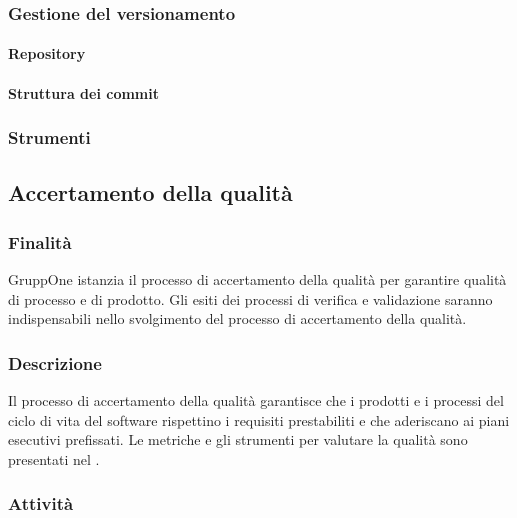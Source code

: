 \documentclass[../norme-di-progetto.tex]{subfiles}
\begin{document}
\subsubsection{Gestione del versionamento}%
\label{subs:gestione_del_versionamento}

\paragraph{Repository}%
\label{par:repository}

\paragraph{Struttura dei commit}%
\label{par:struttura_dei_commit}

\subsubsection{Strumenti}%
\label{subs:gestione_della_configurazione/strumenti}

\subsection{Accertamento della qualità}%
\label{subs:accertamento_della_qualita}

\subsubsection{Finalità}%
\label{subs:accertamento_della_qualita/finalita}

GruppOne istanzia il processo di accertamento della qualità per garantire qualità di processo e di prodotto.
Gli esiti dei processi di verifica e validazione saranno indispensabili nello svolgimento del processo di accertamento della qualità.

\subsubsection{Descrizione}%
\label{subs:accertamento_della_qualita/descrizione}

Il processo di accertamento della qualità garantisce che i prodotti e i processi del ciclo di vita del software rispettino i requisiti prestabiliti e che aderiscano ai piani esecutivi prefissati. Le metriche e gli strumenti per valutare la qualità sono presentati nel .

\subsubsection{Attività}%
\label{subs:accertamento_della_qualita/attivita}
\end{document}
